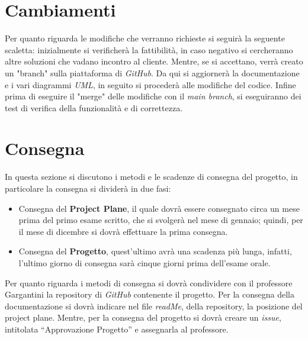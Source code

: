 \documentclass[12pt, letterpaper]{book}
\begin{document}
\section{Cambiamenti}

    Per quanto riguarda le modifiche che verranno richieste si seguirà la seguente scaletta: inizialmente si verificherà la fattibilità, in caso negativo si cercheranno altre soluzioni che vadano incontro al cliente. Mentre, se si accettano, verrà creato un "branch" sulla piattaforma di \textit{GitHub}. Da qui si aggiornerà la documentazione e i vari diagrammi \textit{UML}, in seguito si procederà alle modifiche del codice. Infine prima di eseguire il "merge" delle modifiche con il \textit{main branch}, si eseguiranno dei test di verifica della funzionalità e di correttezza.

\section{Consegna}


    In questa sezione si discutono i metodi e le scadenze di consegna del progetto, in particolare la consegna si dividerà in due fasi:


    \begin{itemize}
        \item Consegna del \textbf{Project Plane}, il quale dovrà essere consegnato circa un mese prima del primo esame scritto, che si svolgerà nel mese di gennaio; quindi, per il mese di dicembre si dovrà effettuare la prima consegna.
        \item Consegna del \textbf{Progetto}, quest'ultimo avrà una scadenza più lunga, infatti, l'ultimo giorno di consegna sarà cinque giorni prima dell'esame orale.
    \end{itemize}
    Per quanto riguarda i metodi di consegna si dovrà condividere con il professore Gargantini la repository di \textit{GitHub} contenente il progetto. Per la consegna della documentazione si dovrà indicare nel file \textit{readMe}, della repository, la posizione del project plane. Mentre, per la consegna del progetto si dovrà creare un \textit{issue}, intitolata “Approvazione Progetto” e assegnarla al professore.


\end{document}
